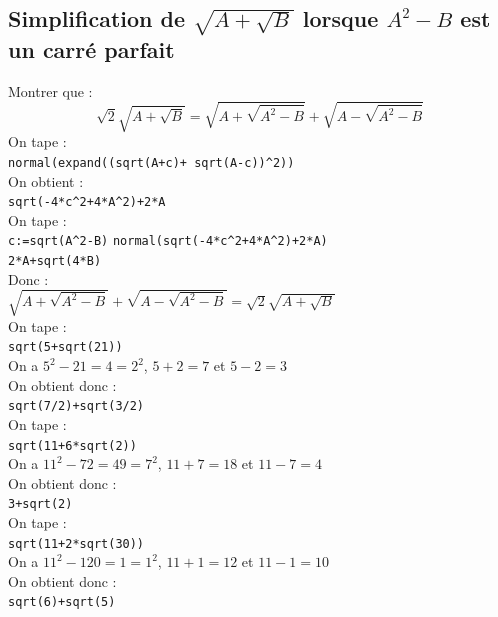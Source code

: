 \documentclass[a4paper,11pt]{book}
\begin{document}
\subsection{Simplification de $\sqrt{A+\sqrt B}$ lorsque $A^2-B$ est un carr\'e parfait}
Montrer que :
$$\sqrt 2\sqrt{A+\sqrt B}=\sqrt{A+\sqrt{A^2-B}}+\sqrt{A-\sqrt{A^2-B}}$$
On tape :\\
{\tt normal(expand((sqrt(A+c)+ sqrt(A-c))\verb|^|2))}\\
On obtient :\\
{\tt sqrt(-4*c\verb|^|2+4*A\verb|^|2)+2*A}\\
On tape :\\
{\tt c:=sqrt(A\verb|^|2-B)}
{\tt normal(sqrt(-4*c\verb|^|2+4*A\verb|^|2)+2*A)}\\
{\tt 2*A+sqrt(4*B)}\\
Donc :\\
$\sqrt{A+\sqrt{A^2-B}}+\sqrt{A-\sqrt{A^2-B}}=\sqrt 2\sqrt{A+\sqrt B}$\\
On tape :\\
{\tt sqrt(5+sqrt(21))}\\
On a $5^2-21=4=2^2$, $5+2=7$ et $5-2=3$\\
On obtient donc :\\
{\tt sqrt(7/2)+sqrt(3/2)}\\
On tape :\\
{\tt sqrt(11+6*sqrt(2))}\\
On a $11^2-72=49=7^2$, $11+7=18$ et $11-7=4$\\
On obtient donc :\\
{\tt 3+sqrt(2)}\\
On tape :\\
{\tt sqrt(11+2*sqrt(30))}\\
On a $11^2-120=1=1^2$, $11+1=12$ et $11-1=10$\\
On obtient donc :\\
{\tt sqrt(6)+sqrt(5)}\\
\end{document}
